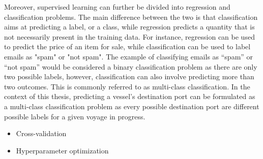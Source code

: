Moreover, supervised learning can further be divided into regression and classification problems. The main difference between the two is that classification aims at predicting a label, or a class, while regression predicts a quantity that is not necessarily present in the training data. For instance, regression can be used to predict the price of an item for sale, while classification can be used to label emails as "spam" or "not spam". The example of classifying emails as ``spam'' or ``not spam'' would be considered a binary classification problem as there are only two possible labels, however, classification can also involve predicting more than two outcomes. This is commonly referred to as multi-class classification. In the context of this thesis, predicting a vessel's destination port can be formulated as a multi-class classification problem as every possible destination port are different possible labels for a given voyage in progress.


\begin{itemize}
    \item Cross-validation
    \item Hyperparameter optimization
\end{itemize}
